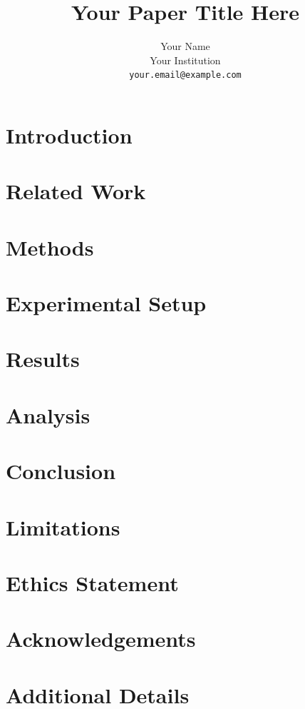\documentclass[11pt]{article}
\title{Your Paper Title Here}
\author{Your Name \\
  Your Institution \\
  \texttt{your.email@example.com}}
\begin{document}
\maketitle

\begin{abstract}
\end{abstract}

\section{Introduction}
\label{sec:intro}
\citep{vaswani2017attention} %

\section{Related Work}
\label{sec:related}

\section{Methods}
\label{sec:methods}

\section{Experimental Setup}
\label{sec:setup}

\section{Results}
\label{sec:results}

\section{Analysis}
\label{sec:analysis}

\section{Conclusion}
\label{sec:conclusion}

\section*{Limitations}

\section*{Ethics Statement}

\section*{Acknowledgements}




\appendix

\section{Additional Details}
\label{sec:appendix}
\end{document}
